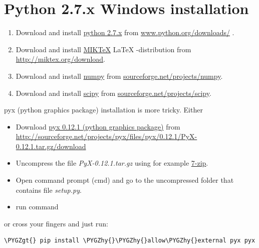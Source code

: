 \documentclass[a4paper,11pt,english]{sphinxmanual}
\def\PYGZgt{\char`\>}
\def\PYGZhy{\char`\-}
\begin{document}
\section{Python 2.7.x Windows installation}
\label{installation/installation:python-2-7-x-windows-installation}\begin{enumerate}
\item {} 
Download and install \href{https://www.python.org}{python 2.7.x} from \href{https://www.python.org/downloads/}{www.python.org/downloads/} .

\item {} 
Download and install \href{http://miktex.org}{MIKTeX} LaTeX -distribution from \href{http://miktex.org/download}{http://miktex.org/download}.

\item {} 
Download and install \href{http://www.numpy.org}{numpy} from \href{http://sourceforge.net/projects/numpy/files/latest/download?source=files}{sourceforge.net/projects/numpy}.

\item {} 
Download and install \href{http://www.scipy.org}{scipy} from \href{http://sourceforge.net/projects/scipy/files/latest/download?source=files}{sourceforge.net/projects/scipy}.

\end{enumerate}

pyx (python graphics package) installation is more tricky. Either
\begin{itemize}
\item {} 
Download \href{http://pyx.sourceforge.net}{pyx 0.12.1 (python graphics package)} from \href{http://sourceforge.net/projects/pyx/files/pyx/0.12.1/PyX-0.12.1.tar.gz/download}{http://sourceforge.net/projects/pyx/files/pyx/0.12.1/PyX-0.12.1.tar.gz/download}

\item {} 
Uncompress the file \emph{PyX-0.12.1.tar.gz} using for example \href{http://www.7-zip.org}{7-zip}.

\item {} 
Open command prompt (cmd) and go to the uncompressed folder that contains file \emph{setup.py}.

\item {} 
run command 

\end{itemize}

or cross your fingers and just run:

\begin{Verbatim}[commandchars=\\\{\},formatcom=\scriptsize]
\PYGZgt{} pip install \PYGZhy{}\PYGZhy{}allow\PYGZhy{}external pyx pyx
\end{Verbatim}
\end{document}
